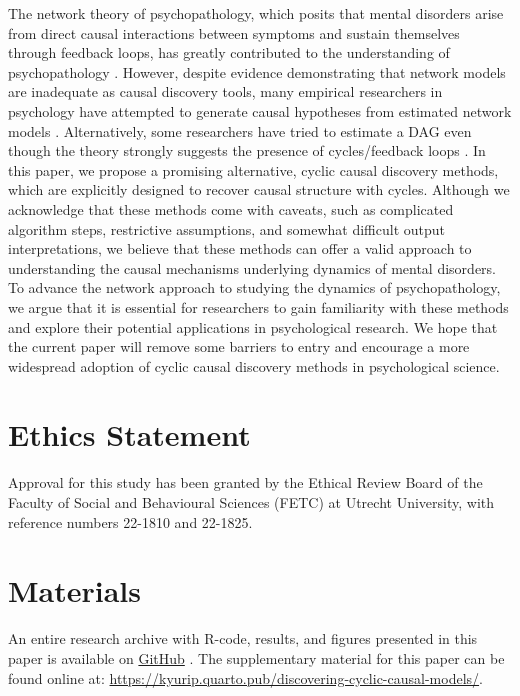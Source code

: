 \documentclass[twoside, 11pt]{article}
\begin{document}
The network theory of psychopathology, which posits that mental disorders arise from direct causal interactions between symptoms and sustain themselves through feedback loops, has greatly contributed to the understanding of psychopathology \citep{borsboom_network_2017}. However, despite evidence demonstrating that network models are inadequate as causal discovery tools, many empirical researchers in psychology have attempted to generate causal hypotheses from estimated network models \citep{Ryan2022}. Alternatively, some researchers have tried to estimate a DAG even though the theory strongly suggests the presence of cycles/feedback loops \citep{mcnally_co-morbid_2017, briganti_tutorial_2022}. In this paper, we propose a promising alternative, cyclic causal discovery methods, which are explicitly designed to recover causal structure with cycles. Although we acknowledge that these methods come with caveats, such as complicated algorithm steps, restrictive assumptions, and somewhat difficult output interpretations, we believe that these methods can offer a valid approach to understanding the causal mechanisms underlying dynamics of mental disorders. To advance the network approach to studying the dynamics of psychopathology, we argue that it is essential for researchers to gain familiarity with these methods and explore their potential applications in psychological research. We hope that the current paper will remove some barriers to entry and encourage a more widespread adoption of cyclic causal discovery methods in psychological science.



\section*{Ethics Statement}
Approval for this study has been granted by the Ethical Review Board of the Faculty of Social and Behavioural Sciences (FETC) at Utrecht University, with reference numbers 22-1810 and 22-1825.

\section*{Materials}  %
An entire research archive with R-code, results, and figures presented in this paper is available on \href{https://github.com/KyuriP/Thesis_KP}{GitHub} \citep{Park_Discovering_cyclic_causal_2023}. The supplementary material for this paper can be found online at: \url{https://kyurip.quarto.pub/discovering-cyclic-causal-models/}.
\end{document}
